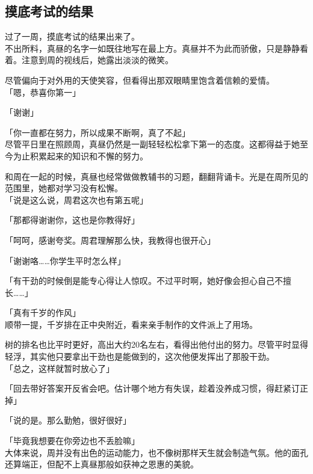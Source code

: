 \subsection{摸底考试的结果}

过了一周，摸底考试的结果出来了。\\

不出所料，真昼的名字一如既往地写在最上方。真昼并不为此而骄傲，只是静静看着。注意到周的视线后，她露出淡淡的微笑。

尽管偏向于对外用的天使笑容，但看得出那双眼睛里饱含着信赖的爱情。\\

「嗯，恭喜你第一」

「谢谢」

「你一直都在努力，所以成果不断啊，真了不起」\\

尽管平日里在照顾周，真昼仍然是一副轻轻松松拿下第一的态度。这都得益于她至今为止积累起来的知识和不懈的努力。

和周在一起的时候，真昼也经常做做教辅书的习题，翻翻背诵卡。光是在周所见的范围里，她都对学习没有松懈。\\

「说是这么说，周君这次也有第五呢」

「那都得谢谢你，这也是你教得好」

「呵呵，感谢夸奖。周君理解那么快，我教得也很开心」

「谢谢咯……你学生平时怎么样」

「有干劲的时候倒是能专心得让人惊叹。不过平时啊，她好像会担心自己不擅长……」

「真有千岁的作风」\\

顺带一提，千岁排在正中央附近，看来亲手制作的文件派上了用场。

树的排名也比平时更好，高出大约20名左右，看得出他付出的努力。尽管平时显得轻浮，其实他只要拿出干劲也是能做到的，这次他便发挥出了那股干劲。\\

「总之，这样就暂时放心了」

「回去带好答案开反省会吧。估计哪个地方有失误，趁着没养成习惯，得赶紧订正掉」

「说的是。那么勤勉，很好很好」

「毕竟我想要在你旁边也不丢脸嘛」\\

大体来说，周并没有出色的运动能力，也不像树那样天生就会制造气氛。他的面孔还算端正，但配不上真昼那般如获神之恩惠的美貌。\\

